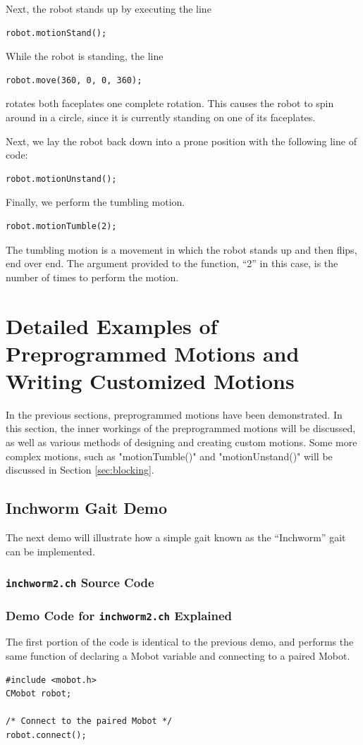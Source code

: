 \documentclass{article}
\begin{document}
Next, the robot stands up by executing the line
\begin{verbatim}
robot.motionStand();
\end{verbatim}

While the robot is standing, the line
\begin{verbatim}
robot.move(360, 0, 0, 360);
\end{verbatim}
rotates both faceplates one complete rotation. This causes the robot to spin around 
in a circle, since it is currently standing on one of its faceplates.

Next, we lay the robot back down into a prone position with the following line
of code:
\begin{verbatim}
robot.motionUnstand();
\end{verbatim}

Finally, we perform the tumbling motion. 
\begin{verbatim}
robot.motionTumble(2);
\end{verbatim}
The tumbling motion is a movement in which
the robot stands up and then flips, end over end. The argument provided to the
function, ``2'' in this case, is the number of times to perform the motion.

\section{Detailed Examples of Preprogrammed Motions and Writing Customized Motions}
In the previous sections, preprogrammed motions have been demonstrated. In this section,
the inner workings of the preprogrammed motions will be discussed, as well as various
methods of designing and creating custom motions. Some more complex motions, such as 
"motionTumble()" and "motionUnstand()" will be discussed in Section \ref{sec:blocking}.
\subsection{Inchworm Gait Demo}
The next demo will illustrate how a simple gait known as the ``Inchworm'' gait 
can be implemented.

\subsubsection{\texttt{inchworm2.ch} Source Code}


\subsubsection{Demo Code for \texttt{inchworm2.ch} Explained}
The first portion of the code is identical to the previous demo, and performs
the same function of declaring a Mobot variable and connecting to a 
paired Mobot.
\begin{verbatim}
#include <mobot.h>
CMobot robot;

/* Connect to the paired Mobot */
robot.connect();
\end{verbatim}
\end{document}
